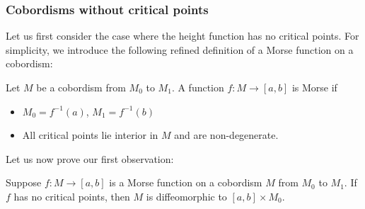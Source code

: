 \subsubsection*{Cobordisms without critical points}
Let us first consider the case where the height function has no critical points.
For simplicity, we introduce the following refined definition of a Morse function on a cobordism:
\begin{definition}
    Let $M$ be a cobordism from $M_0$ to $M_1$.
    A function $f: M \to  [a, b]$ is Morse if 
    \begin{itemize}
        \item $M_0 = f^{-1}(a)$, $M_1 = f^{-1}(b)$
        \item All critical points lie interior in $M$ and are non-degenerate.
    \end{itemize}
\end{definition}

Let us now prove our first observation:
\begin{prop}
    Suppose $f: M \to  [a, b]$ is a Morse function on a cobordism $M$ from  $ M_0$ to $ M_1$.
    If $f$ has no critical points, then $M$ is diffeomorphic to $[a, b] \times  M_0$.
\end{prop}

